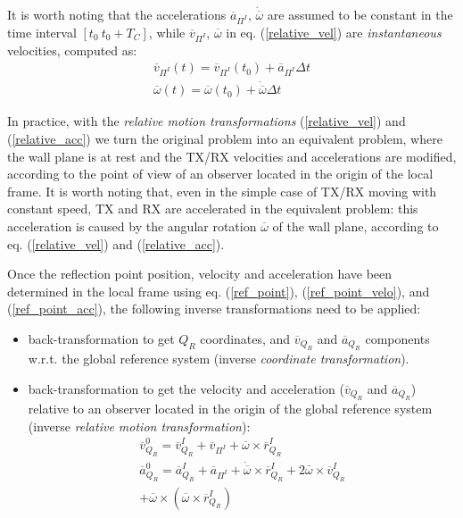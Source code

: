 It is worth noting that the accelerations $\overline{a}_{\Pi^{I}}$, $\dot{\overline{\omega}}$ are assumed to be constant in the time interval $[t_0~t_0+T_C]$, while $\overline{v}_{\Pi^{I}}$, $\overline{\omega}$ in eq. (\ref{relative_vel}) are \textit{instantaneous} velocities, computed as:
\begin{equation*}
\begin{gathered}
\overline{v}_{\Pi^{I}}(t)=\overline{v}_{\Pi^{I}}(t_0)+\overline{a}_{\Pi^{I}}\Delta t \\
\overline{\omega}(t)=\overline{\omega}(t_0)+\dot{\overline{\omega}} \Delta t
\end{gathered}
\end{equation*}

In practice, with the \textit{relative motion transformations} (\ref{relative_vel}) and (\ref{relative_acc}) we turn the original problem into an equivalent problem, where the wall plane is at rest and the TX/RX velocities and accelerations are modified, according to the point of view of an observer located in the origin of the local frame. It is worth noting that, even in the simple case of TX/RX moving with constant speed, TX and RX are accelerated in the equivalent problem: this acceleration is caused by the angular rotation ${\overline{\omega}}$ of the wall plane, according to eq. (\ref{relative_vel}) and (\ref{relative_acc}).
\par

Once the reflection point position, velocity and acceleration have been determined in the local frame using eq. (\ref{ref_point}), (\ref{ref_point_velo}), and (\ref{ref_point_acc}), the following inverse transformations need to be applied: 
\begin{itemize}
	\item back-transformation to get $Q_R$ coordinates, and $\overline{v}_{Q_{R}}$ and $\overline{a}_{Q_{R}}$ components w.r.t. the global reference system (inverse \textit{coordinate  transformation}).
	\item back-transformation to get the velocity and acceleration ($\overline{v}_{Q_{R}}$ and $\overline{a}_{Q_{R}}$) relative to an observer located in the origin of the global reference system (inverse \textit{relative motion transformation}):
	\begin{gather}
	    \overline{v}_{Q_R}^{0} = \overline{v}_{Q_R}^{I} + \overline{v}_{\Pi^{I}} + \overline{\omega} \times \overline{r}_{Q_R}^{I} \label{global_vel_ref_point} \\
        \overline{a}_{Q_R}^{0} = \overline{a}_{Q_R}^{I} + \overline{a}_{\Pi^{I}} + \dot{\overline{\omega}} \times \overline{r}_{Q_R}^{I} + 2 \overline{\omega} \times \overline{v}_{Q_R}^{I} \label{global_acc_ref_point} \\ \nonumber
        +\overline{\omega} \times (\overline{\omega} \times \overline{r}_{Q_R}^{I})   
	\end{gather}
\end{itemize}  


